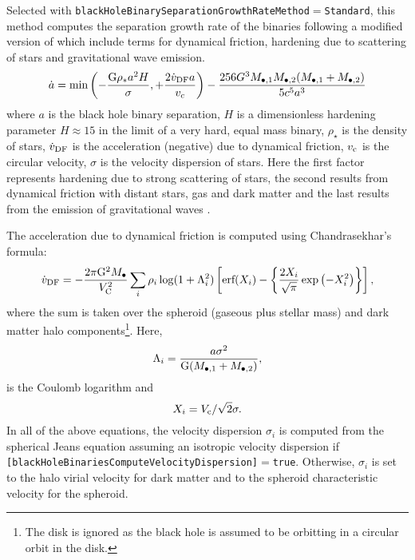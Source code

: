 Selected with {\tt blackHoleBinarySeparationGrowthRateMethod}$=${\tt Standard}, this method computes the separation growth rate of the binaries following a modified version of \cite {volonteri_assembly_2003} which include terms for dynamical friction, hardening due to scattering of stars and gravitational wave emission.
\begin{equation}
\dot{a} = \hbox{min} \left( - \frac{{\rm G}\rho _{*}a^2 H}{\sigma}, +\frac{2 \dot{v}_{\rm DF} a}{v_c} \right) - \frac{256 G^3 M_{\bullet, 1} M_{\bullet, 2} (M_{\bullet, 1} +M_{\bullet, 2})}{5 c^5 a^3}
\end{equation}
where $a$ is the black hole binary
separation, $H$ is a dimensionless hardening parameter $H\approx 15$ in the limit of 
a very hard, equal mass binary, $\rho _\star$ is the density of stars,
$\dot{v}_{\rm DF}$ is the acceleration (negative) due to dynamical friction,
$v_{\rm c}$ is the circular velocity, $\sigma$ is the velocity dispersion of stars. Here the first factor represents hardening due to strong scattering of stars, the second results from dynamical friction with distant stars, gas and dark matter and the last results from the emission of gravitational waves \cite{peters_gravitational_1964}.

The acceleration due to dynamical friction is computed using Chandrasekhar's formula:
\begin{equation}
 \dot{v}_{\rm DF}=- {2 \pi {\rm G}^2 M_\bullet \over V_{\rm C}^2} \sum_{i} \rho_i \log(1+\Lambda_i^2) \left[ \hbox{erf}(X_i)-\left\{ {2 X_i \over \sqrt{\pi}} \exp\left(-X_i^2\right) \right\} \right],
\end{equation}
where the sum is taken over the spheroid (gaseous plus stellar mass) and dark matter halo components\footnote{The disk is ignored as the black hole is assumed to be orbitting in a circular orbit in the disk.}. Here,
\begin{equation}
\Lambda_i =  {a \sigma^2  \over {\rm G}(M_{\bullet, 1}+M_{\bullet, 2})},
\end{equation}
is the Coulomb logarithm and
\begin{equation}
X_i = V_{\rm c} / \sqrt{2} \sigma.
\end{equation}
In all of the above equations, the velocity dispersion $\sigma_i$ is computed from the spherical Jeans equation assuming an isotropic velocity dispersion if {\tt [blackHoleBinariesComputeVelocityDispersion]}$=${\tt true}. Otherwise, $\sigma_i$ is set to the halo virial velocity for dark matter and to the spheroid characteristic velocity for the spheroid.

